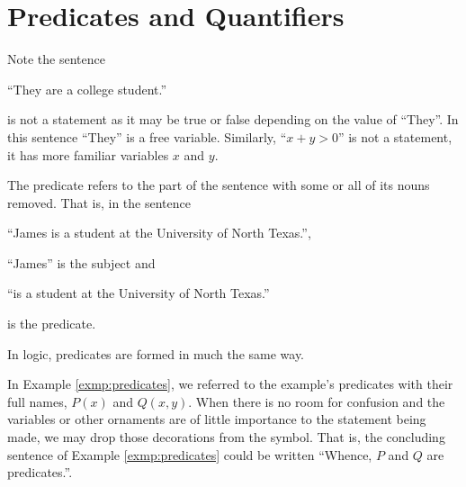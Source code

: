 \guard

\section{Predicates and Quantifiers}
\label{sec:predicatesAndQuantifiers}

Note the sentence
  \begin{center}
    ``They are a college student.''
  \end{center}
  is not a statement as it may be true or false depending on the value of ``They''.
In this sentence ``They'' is a free variable.
Similarly, ``$x+y>0$'' is not a statement, it has more familiar variables $x$ and $y$.

The predicate refers to the part of the sentence with some or all of its nouns removed.
That is, in the sentence
  \begin{center}
    ``James is a student at the University of North Texas.'',
  \end{center}
  ``James'' is the subject and
  \begin{center}
    ``is a student at the University of North Texas.''
  \end{center}
  is the predicate.

In logic, predicates are formed in much the same way.

In Example \ref{exmp:predicates}, we referred to the example's predicates with their full names, $P(x)$ and $Q(x,y)$.
When there is no room for confusion and the variables or other ornaments are of little importance to the statement being made, we may drop those decorations from the symbol.
That is, the concluding sentence of Example \ref{exmp:predicates} could be written ``Whence, $P$ and $Q$ are predicates.''.





